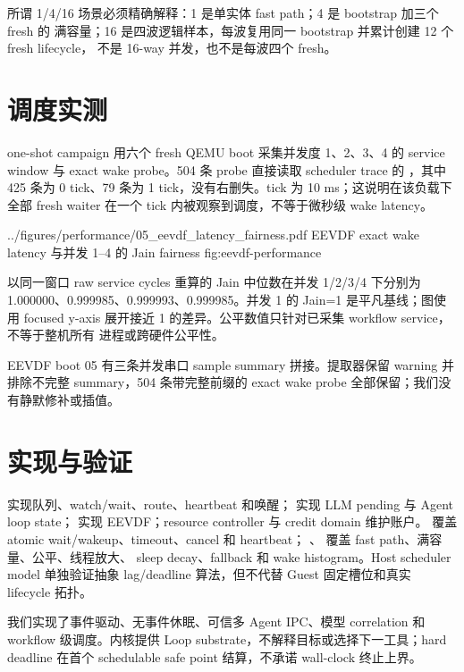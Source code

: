 所谓 1/4/16 场景必须精确解释：1 是单实体 fast path；4 是 bootstrap 加三个 fresh 的
满容量；16 是四波逻辑样本，每波复用同一 bootstrap 并累计创建 12 个 fresh lifecycle，
不是 16-way 并发，也不是每波四个 fresh。

\section{调度实测}

one-shot campaign 用六个 fresh QEMU boot 采集并发度 1、2、3、4 的 service window 与
exact wake probe。504 条 probe 直接读取 scheduler trace 的 ，其中
425 条为 0 tick、79 条为 1 tick，没有右删失。tick 为 10 ms；这说明在该负载下全部
fresh waiter 在一个 tick 内被观察到调度，不等于微秒级 wake latency。

  {../figures/performance/05_eevdf_latency_fairness.pdf}
  {EEVDF exact wake latency 与并发 1--4 的 Jain fairness}
  {fig:eevdf-performance}

以同一窗口 raw service cycles 重算的 Jain 中位数在并发 1/2/3/4 下分别为
1.000000、0.999985、0.999993、0.999985。并发 1 的 Jain=1 是平凡基线；图使用 focused
y-axis 展开接近 1 的差异。公平数值只针对已采集 workflow service，不等于整机所有
进程或跨硬件公平性。

EEVDF boot 05 有三条并发串口 sample summary 拼接。提取器保留 warning 并排除不完整
summary，504 条带完整前缀的 exact wake probe 全部保留；我们没有静默修补或插值。

\section{实现与验证}

 实现队列、watch/wait、route、heartbeat 和唤醒；
 实现 LLM pending 与 Agent loop state；
 实现 EEVDF；resource controller 与 credit domain 维护账户。
 覆盖 atomic wait/wakeup、timeout、cancel 和 heartbeat；
、 覆盖 fast path、满容量、公平、线程放大、
sleep decay、fallback 和 wake histogram。Host scheduler model 单独验证抽象 lag/deadline
算法，但不代替 Guest 固定槽位和真实 lifecycle 拓扑。

\begin{evidencebox}[任务五结论]
我们实现了事件驱动、无事件休眠、可信多 Agent IPC、模型 correlation 和 workflow
级调度。内核提供 Loop substrate，不解释目标或选择下一工具；hard deadline 在首个
schedulable safe point 结算，不承诺 wall-clock 终止上界。
\end{evidencebox}
